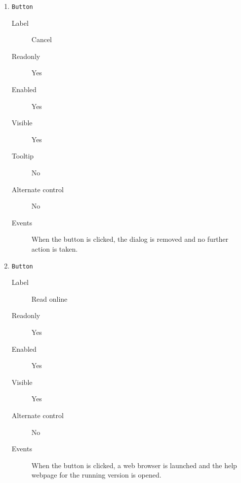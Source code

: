 \begin{enumerate}
    \item \texttt{Button}
              \begin{description}
                  \item[Label] Cancel
                  \item[Readonly] Yes
                  \item[Enabled] Yes
                  \item[Visible] Yes
                  \item[Tooltip] No
                  \item[Alternate control] No
                  \item[Events] When the button is clicked, the dialog is removed
                                and no further action is taken.
              \end{description}

    \item \texttt{Button}
              \begin{description}
                  \item[Label] Read online
                  \item[Readonly] Yes
                  \item[Enabled] Yes
                  \item[Visible] Yes
                  \item[Alternate control] No
                  \item[Events] When the button is clicked, a web browser is
                                launched and the  help webpage
                                for the running version is opened.
              \end{description}

\end{enumerate}

